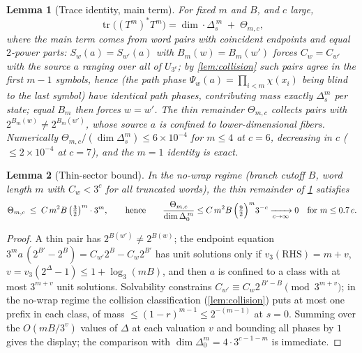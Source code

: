 \documentclass[11pt]{article}
\theoremstyle{plain}
\newtheorem{lemma}{Lemma}
\theoremstyle{definition}
\theoremstyle{remark}
\begin{document}
\begin{lemma}[Trace identity, main term]\label{lem:trace}
For fixed $m$ and $B$, and $c$ large,
\[
\operatorname{tr}\bigl((T^m)^*T^m\bigr)
=\dim\cdot\Delta_s^{\,m}\;+\;\Theta_{m,c},
\]
where the main term comes from word pairs with coincident endpoints and equal
$2$-power parts: $S_w(a)=S_{w'}(a)$ with $B_m(w)=B_m(w')$ forces $C_w=C_{w'}$
with the source $a$ ranging over \emph{all} of $U_{3^c}$; by
\cref{lem:collision} such pairs agree in the first $m-1$ symbols, hence (the
path phase $\Psi_w(a)=\prod_{i<m}\chi(x_i)$ being blind to the last symbol)
have \emph{identical} path phases, contributing mass exactly $\Delta_s^m$ per
state; equal $B_m$ then forces $w=w'$. The thin remainder $\Theta_{m,c}$
collects pairs with $2^{B_m(w)}\ne2^{B_m(w')}$, whose source $a$ is confined to
lower-dimensional fibers. Numerically
$\Theta_{m,c}/(\dim\Delta_s^m)\le6\times10^{-4}$ for $m\le4$ at $c=6$,
\emph{decreasing} in $c$ ($\le2\times10^{-4}$ at $c=7$), and the $m=1$
identity is exact.
\end{lemma}

\begin{lemma}[Thin-sector bound]\label{lem:thin}
In the no-wrap regime (branch cutoff $B$, word length $m$ with
$C_w<3^c$ for all truncated words), the thin remainder of \cref{lem:trace}
satisfies
\[
\Theta_{m,c}\;\le\;C\,m^2B\,\bigl(\tfrac32\bigr)^{m}\cdot3^{m} ,
\qquad\text{hence}\qquad
\frac{\Theta_{m,c}}{\dim\Delta_0^{\,m}}\le
C\,m^2B\,\Bigl(\tfrac92\Bigr)^{m}3^{-c}\xrightarrow[c\to\infty]{}0
\quad\text{for }m\le0.7\,c .
\]
\end{lemma}
\begin{proof}
A thin pair has $2^{B(w')}\ne2^{B(w)}$; the endpoint equation
$3^ma\,(2^{B'}-2^{B})=C_{w'}2^{B}-C_w2^{B'}$ has unit solutions only if
$v_3(\mathrm{RHS})=m+v$, $v=v_3(2^{\Delta}-1)\le1+\log_3(mB)$, and then $a$ is
confined to a class with at most $3^{m+v}$ unit solutions. Solvability
constrains $C_{w'}\equiv C_w2^{\,B'-B}\pmod{3^{m+v}}$; in the no-wrap regime
the collision classification (\cref{lem:collision}) puts at most one prefix in
each class, of mass $\le(1-r)^{m-1}\le2^{-(m-1)}$ at $s=0$. Summing over the
$O(mB/3^v)$ values of $\Delta$ at each valuation $v$ and bounding all phases by
$1$ gives the display; the comparison with $\dim\Delta_0^m=4\cdot3^{c-1-m}$ is
immediate.
\end{proof}
\end{document}
